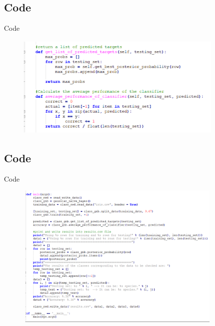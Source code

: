\documentclass{beamer}
\begin{document}
\subsection{Code}
    \begin{frame}{Code}
        \begin{center}
            \begin{figure}
                \begin{center}
                     \includegraphics[width = 10cm, height = 5cm]{Theme/images/gaussian6.PNG}
                \end{center}
            \end{figure}
        \end{center}
    \end{frame}

\subsection{Code}
    \begin{frame}{Code}
        \begin{center}
            \begin{figure}
                \begin{center}
                    \includegraphics[width = 10cm, height = 7cm]{Theme/images/mains.PNG}
                \end{center}
            \end{figure}
        \end{center}
    \end{frame}
\end{document}
